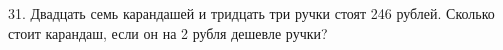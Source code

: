 31. Двадцать семь карандашей и тридцать три ручки стоят 246 рублей. Сколько стоит карандаш, если он на 2 рубля дешевле ручки?\\
